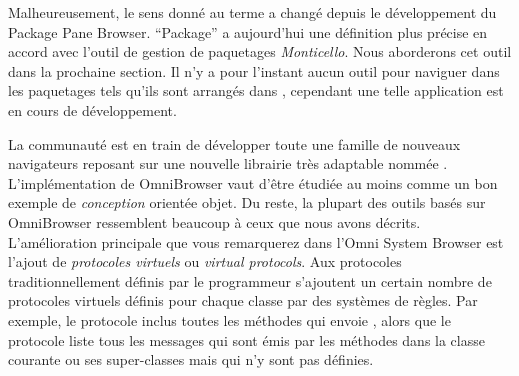 \documentclass[a4paper,10pt,twoside]{book}
\begin{document}
Malheureusement, le sens donn\'e au terme  a chang\'e depuis
le d\'eveloppement du Package Pane Browser. ``Package'' a aujourd'hui
une d\'efinition plus pr\'ecise en accord avec l'outil de gestion
de paquetages \emph{Monticello}. Nous aborderons cet outil dans la
prochaine section.  Il n'y a pour l'instant aucun outil pour naviguer
dans les paquetages tels qu'ils sont arrang\'es dans , cependant
une telle application est en cours de d\'eveloppement.

La communaut\'e \pharo est en train de d\'evelopper toute une famille de nouveaux
navigateurs reposant sur une nouvelle librairie tr\`es adaptable nomm\'ee
.  L'impl\'ementation de OmniBrowser vaut d'\^etre 
\'etudi\'ee au moins comme un bon exemple de \emph{conception} orient\'ee
objet. 
Du reste, la plupart des outils bas\'es sur OmniBrowser ressemblent beaucoup
\`a ceux que nous avons d\'ecrits.
L'am\'elioration principale que vous remarquerez dans l'Omni System Browser 
est l'ajout de \emph{protocoles virtuels} ou \emph{virtual protocols}.
Aux protocoles traditionnellement d\'efinis par le programmeur s'ajoutent
un certain nombre de protocoles virtuels d\'efinis pour chaque classe 
par des syst\`emes de r\`egles. 
Par exemple, le protocole  inclus toutes
les m\'ethodes qui envoie \super, alors que le protocole
  liste tous les messages qui sont \'emis
par les m\'ethodes dans la classe courante ou ses super-classes 
mais qui n'y sont pas d\'efinies.



\end{document}
